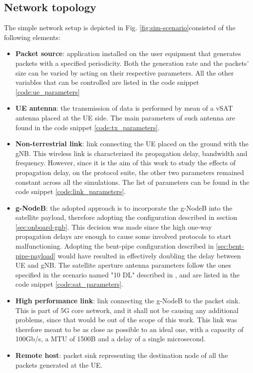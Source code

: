 \subsection{Network topology}
The simple network setup is depicted in Fig. \ref{fig:sim-scenario}consisted of the following elements:
\begin{itemize}
    \item \textbf{Packet source}: application installed on the user equipment that generates packets with a specified periodicity. Both the generation rate and the packets' size can be varied by acting on their respective parameters. All the other variables that can be controlled are listed in the code snippet \ref{code:ue_parameters}
    \item \textbf{UE antenna}: the transmission of data is performed by mean of a \ac{vSAT} antenna placed at the \ac{UE} side. The main parameters of such antenna are found in the code snippet \ref{code:tx_parameters}.
    \item \textbf{Non-terrestrial link}: link connecting the \ac{UE} placed on the ground with the \ac{gNB}. This wireless link is characterized its propagation delay, bandwidth and frequency. However, since it is the aim of this work to study the effects of propagation delay, on the protocol suite, the other two parameters remained constant across all the simulations. The list of parameters can be found in the code snippet \ref{code:link_parameters}.
    \item \textbf{g-NodeB}: the adopted approach is to incorporate the g-NodeB into the satellite payload, therefore adopting the configuration described in section \ref{sec:onboard-gnb}. This decision was made since the high one-way propagation delays are enough to cause some involved protocols to start malfunctioning. Adopting the bent-pipe configuration described in \ref{sec:bent-pipe-payload} would have resulted in effectively doubling the delay between \ac{UE} and \ac{gNB}. The satellite aperture antenna parameters follow the ones specified in the scenario named "10 DL" described in \cite{3gpp-tr-38.821}, and are listed in the code snippet \ref{code:sat_parameters}.
    \item \textbf{High performance link}: link connecting the g-NodeB to the packet sink. This is part of 5G core network, and it shall not be causing any additional problems, since that would be out of the scope of this work. This link was therefore meant to be as close as possible to an ideal one, with a capacity of 100Gb/s, a \ac{MTU} of 1500B and a delay of a single microsecond.
    \item \textbf{Remote host}: packet sink representing the destination node of all the packets generated at the \ac{UE}.
\end{itemize}



